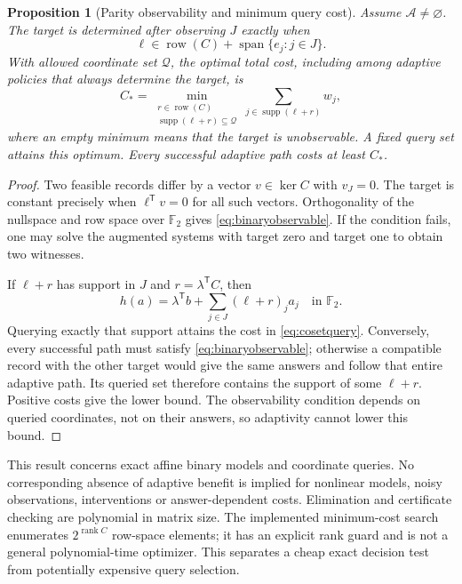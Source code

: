 \documentclass[11pt,a4paper]{article}
\newtheorem{proposition}[theorem]{Proposition}
\theoremstyle{definition}\newtheorem{definition}[theorem]{Definition}
\begin{document}
\begin{proposition}[Parity observability and minimum query cost]\label{prop:binaryquery}
Assume $\mathcal A\ne\varnothing$. The target is determined after observing $J$ exactly when
\begin{equation}
 \ell\in\operatorname{row}(C)+\operatorname{span}\{e_j:j\in J\}.
 \label{eq:binaryobservable}
\end{equation}
With allowed coordinate set $\mathcal Q$, the optimal total cost, including among adaptive policies that always determine the target, is
\begin{equation}
 C_* = \min_{\substack{r\in\operatorname{row}(C)\\
                     \operatorname{supp}(\ell+r)\subseteq\mathcal Q}}
           \sum_{j\in\operatorname{supp}(\ell+r)}w_j,
 \label{eq:cosetquery}
\end{equation}
where an empty minimum means that the target is unobservable. A fixed query set attains this optimum. Every successful adaptive path costs at least $C_*$.
\end{proposition}
\begin{proof}
Two feasible records differ by a vector $v\in\ker C$ with $v_J=0$. The target is constant precisely when $\ell^{\mathsf T}v=0$ for all such vectors. Orthogonality of the nullspace and row space over $\mathbb F_2$ gives \eqref{eq:binaryobservable}. If the condition fails, one may solve the augmented systems with target zero and target one to obtain two witnesses.

If $\ell+r$ has support in $J$ and $r=\lambda^{\mathsf T}C$, then
\[
 h(a)=\lambda^{\mathsf T}b+\sum_{j\in J}(\ell+r)_ja_j
 \quad\text{in }\mathbb F_2.
\]
Querying exactly that support attains the cost in \eqref{eq:cosetquery}. Conversely, every successful path must satisfy \eqref{eq:binaryobservable}; otherwise a compatible record with the other target would give the same answers and follow that entire adaptive path. Its queried set therefore contains the support of some $\ell+r$. Positive costs give the lower bound. The observability condition depends on queried coordinates, not on their answers, so adaptivity cannot lower this bound.
\end{proof}

This result concerns exact affine binary models and coordinate queries. No corresponding absence of adaptive benefit is implied for nonlinear models, noisy observations, interventions or answer-dependent costs. Elimination and certificate checking are polynomial in matrix size. The implemented minimum-cost search enumerates $2^{\operatorname{rank}C}$ row-space elements; it has an explicit rank guard and is not a general polynomial-time optimizer. This separates a cheap exact decision test from potentially expensive query selection.
\end{document}

